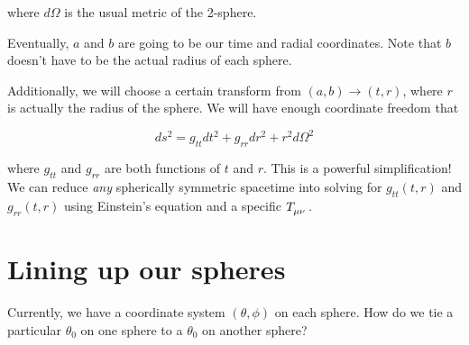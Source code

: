 \documentclass[11pt,table]{article}
\begin{document}
where $d\Omega$ is the usual metric of the 2-sphere.

Eventually, $a$ and $b$ are going to be our time and radial coordinates. Note that $b$ doesn't have to be the actual radius of each sphere.

Additionally, we will choose a certain transform from $(a,b) \to (t,r)$, where $r$ is actually the radius of the sphere. We will have enough coordinate freedom that

\begin{equation}\label{eq:spherical}
  ds^2 = g_{tt}dt^2 + g_{rr}dr^2 + r^2d\Omega^2
\end{equation}

where $g_{tt}$ and $g_{rr}$ are both functions of $t$ and $r$. This is a powerful simplification! We can reduce \textit{any} spherically symmetric spacetime into solving for $g_{tt}(t,r)$ and $g_{rr}(t,r)$ using Einstein's equation and a specific $\tensor{T}{_\mu_\nu}$.

\section{Lining up our spheres}

Currently, we have a coordinate system $(\theta, \phi)$ on each sphere. How do we tie a particular $\theta_0$ on one sphere to a $\theta_0$ on another sphere?
\end{document}
